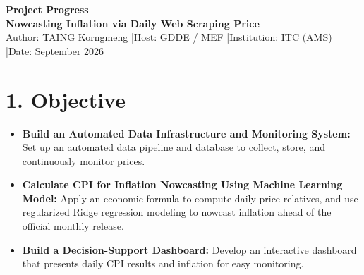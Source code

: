 \documentclass[10pt,a4paper]{article}
\begin{document}

\begin{center}
    {\large\bfseries\color{Teal} Project Progress}\\[0.08cm]
    {\LARGE\bfseries\color{NavyBlue} Nowcasting Inflation via Daily Web Scraping Price}\\[0.05cm]
    {\footnotesize Author: TAING Korngmeng \quad|\quad Host: GDDE / MEF \quad|\quad Institution: ITC (AMS) \quad|\quad Date: September 2026}
\end{center}

\vspace{-0.10cm}

\section*{1. Objective}

\begin{itemize}[noitemsep,topsep=1.5pt,leftmargin=*]
    \item \textbf{Build an Automated Data Infrastructure and Monitoring System:} Set up an automated data pipeline and database to collect, store, and continuously monitor prices.
    \item \textbf{Calculate CPI for Inflation Nowcasting Using Machine Learning Model:} Apply an economic formula to compute daily price relatives, and use regularized Ridge regression modeling to nowcast inflation ahead of the official monthly release.
    \item \textbf{Build a Decision-Support Dashboard:} Develop an interactive dashboard that presents daily CPI results and inflation for easy monitoring.
\end{itemize}

\vspace{-0.10cm}
\end{document}
